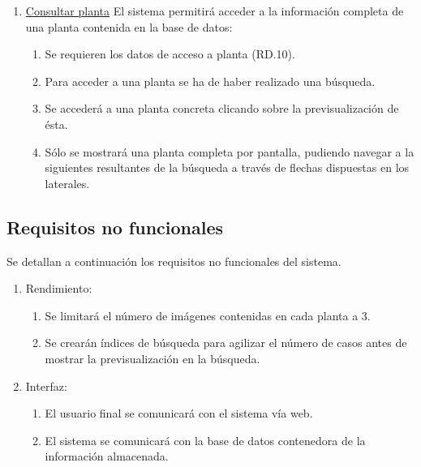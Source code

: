 \documentclass[10pt,a4paper]{article}
\begin{document}
\begin{enumerate}[label=RF\arabic*. ,leftmargin=2.8\parindent]
	\bigskip
	\item \underline{Consultar planta}
	\newline \newline
	El sistema permitirá acceder a la información completa de una planta contenida en la base de datos:
	\begin{enumerate}[label=-]
		\item Se requieren los datos de acceso a planta (RD.10).
		\item Para acceder a una planta se ha de haber realizado una búsqueda.
		\item Se accederá a una planta concreta clicando sobre la previsualización de ésta.
		\item Sólo se mostrará una planta completa por pantalla, pudiendo navegar a la siguientes resultantes de la búsqueda a través de flechas dispuestas en los laterales.
	\end{enumerate}
	
\end{enumerate}

\subsection{\textbf{Requisitos no funcionales}}

Se detallan a continuación los requisitos no funcionales del sistema.
\newline

\begin{enumerate}[label=RNF\arabic*. ,leftmargin=3.2\parindent]
	
	\item Rendimiento:
		\begin{enumerate}[label=-]
			\item Se limitará el número de imágenes contenidas en cada planta a 3.
			\item Se crearán índices de búsqueda para agilizar el número de casos antes de mostrar la previsualización en la búsqueda.
		    
		\end{enumerate}
		
	\item Interfaz:
		\begin{enumerate}[label=-]
			\item El usuario final se comunicará con el sistema vía web.
			\item El sistema se comunicará con la base de datos contenedora de la información almacenada.
		\end{enumerate}
	
\end{enumerate}
\end{document}
